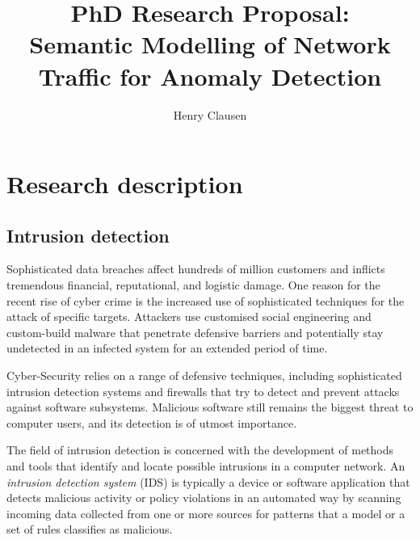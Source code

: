\documentclass[a4paper,12pt,twoside]{report}
\makeatletter
\newcommand*{\toccontents}{\@starttoc{toc}}
\makeatother
\begin{document}
\title{\LARGE {\bf PhD Research Proposal:\\Semantic Modelling of Network Traffic for Anomaly Detection}\\
 \vspace*{-5mm}
}
\author{Henry Clausen}

\maketitle



\toccontents



\chapter{Research description}


\section{Intrusion detection}

Sophisticated data breaches affect hundreds of million customers and inflicts tremendous financial, reputational, and logistic damage. One reason for the recent rise of cyber crime is the increased use of sophisticated techniques for the attack of specific targets. Attackers use customised social engineering and custom-build malware that penetrate defensive barriers and potentially stay undetected in an infected system for an extended period of time. 

Cyber-Security relies on a range of defensive techniques, including sophisticated intrusion detection systems and firewalls that try to detect and prevent attacks against software subsystems. Malicious software still remains the biggest threat to computer users, and its detection is of utmost importance. 

The field of intrusion detection is concerned with the development of methods and tools that identify and locate possible intrusions in a computer network. An \textit{intrusion detection system} (IDS) is typically a device or software application that detects malicious activity or policy violations in an automated way by scanning incoming data collected from one or more sources for patterns that a model or a set of rules classifies as malicious.
\end{document}
